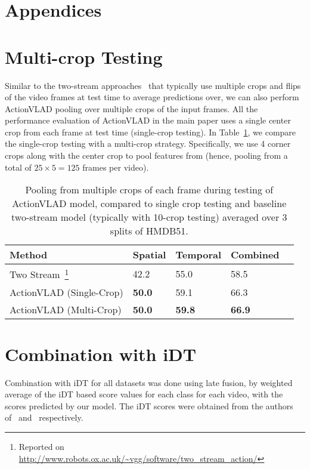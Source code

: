 \documentclass[10pt,twocolumn,letterpaper]{article}
\newcommand{\methodTag}[0]{ActionVLAD}
\newcommand{\tableSize}[0]{\scriptsize}
\begin{document}
{\small


}

\clearpage
\appendix

\section*{Appendices}

\section{Multi-crop Testing}
Similar to the two-stream approaches~\cite{WangL_15_GoodPrac,WangL_16a} that typically use multiple crops and flips of the video frames at test time to average predictions over, we can also perform \methodTag{} pooling over multiple crops of the input frames.
All the performance evaluation of \methodTag{} in the main paper
uses a single center crop from each frame at test time (single-crop testing).
In Table~\ref{tab:multi-crop}, we 
compare the single-crop testing with 
a multi-crop strategy. Specifically, we use 4 corner
crops along with the center crop to pool features
from (hence, pooling from a total of
$25\times 5 = 125$ frames per video).

\begin{table}[t]
\caption{Pooling from multiple crops of each frame
during testing of \methodTag{} model, compared to
single crop testing and baseline two-stream model
  (typically with 10-crop testing) averaged over 3 splits of HMDB51.
}\label{tab:multi-crop}
\tableSize{}
\centering
\begin{tabular}{lllll}
\toprule
  Method    & Spatial & Temporal & Combined \\
\midrule
  Two Stream~\cite{WangL_15_GoodPrac,WangX_16a}\footnote{Reported on \url{http://www.robots.ox.ac.uk/~vgg/software/two_stream_action/}} & 42.2 & 55.0 & 58.5 & \\
  \methodTag{} (Single-Crop) & {\bf 50.0} & 59.1 & 66.3 \\
  \methodTag{} (Multi-Crop) & {\bf 50.0} & {\bf 59.8} & {\bf 66.9} \\
\bottomrule
\end{tabular}
\end{table}


\section{Combination with iDT}
Combination with iDT for all datasets was done using late fusion, by weighted 
average of the iDT based score values for each class for each video, with the scores
predicted by our model. The iDT scores were obtained from the authors of~\cite{Varol_16}
and~\cite{charades} respectively.
\end{document}
